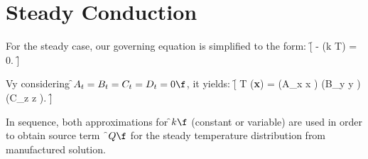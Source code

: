 \documentclass[a4paper,10pt]{article}
\begin{document}
\section{Steady Conduction}
For the steady case, our governing equation is simplified to the form:
\f[
 - \nabla \cdot (k \nabla T) = 0.
\f]

Vy considering \f$A_t = B_t = C_t = D_t = 0\f$, it yields:
\f[
  T ({\bf x}) = \cos(A_x x ) \cdot \cos(B_y y ) \cdot \cos(C_z z ).
\f]

In sequence, both approximations for \f$k\f$ (constant or variable) are used in order to obtain source term~ \f$Q\f$ for the steady temperature
distribution from manufactured solution.
\end{document}
